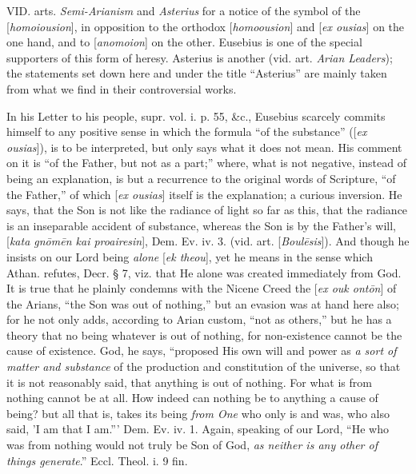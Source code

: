 
VID.
arts. \emph{Semi-Arianism} and
\emph{Asterius} for a
notice of the symbol of the [\emph{homoiousion}], in opposition to the
orthodox [\emph{homoousion}] and [\emph{ex ousias}] on the one hand,
and to [\emph{anomoion}] on the other. Eusebius is one of the special
supporters of this form of heresy. Asterius is another (vid. art. \emph{Arian
Leaders}); the statements set down here and under the title ``Asterius''
are mainly taken from what we find in their controversial works.

In his Letter to his people, supr. vol. i. p. 55,
\&c., Eusebius scarcely commits himself to any positive sense in
which the formula ``of the substance'' ([\emph{ex ousias}]), is to be
interpreted, but only says what it does not mean. His comment on it is
``of the Father, but not as a part;'' where, what is not negative,
instead of being an explanation, is but a recurrence to the original
words of Scripture, ``of the Father,'' of which [\emph{ex ousias}]
itself is the explanation; a curious inversion. He says, that the Son
is not like the radiance of light so far as this, that the radiance is
an inseparable accident of substance, whereas the Son is by the Father's
will, [\emph{kata gn\={o}m\={e}n kai proairesin}], Dem. Ev. iv.
3. (vid. art. [\emph{Boul\={e}sis}]). And though he insists on our
Lord being \emph{alone} [\emph{ek theou}], yet he means in the sense which Athan.
refutes, Decr. § 7, viz. that He alone was created immediately from
God. It is true that he plainly condemns with the Nicene Creed the [\emph{ex
ouk ont\={o}n}] of the Arians, ``the Son was out of nothing,'' but
an evasion was at hand here also; for he not only adds, according to
Arian custom, ``not as others,'' but he has a theory that no being
whatever is out of nothing, for non-existence cannot be the cause of
existence. God, he says, ``proposed His own will and power as \emph{a sort
of matter and substance} of
the production and constitution of the universe, so that it is not
reasonably said, that anything is out of nothing. For what is from
nothing cannot be at all. How indeed can nothing be to anything a
cause of being? but all that is, takes its being \emph{from One}
who only is and was, who also said, 'I am that I am.''' Dem. Ev.
iv. 1. Again, speaking of our Lord, ``He who was from nothing would not
truly be Son of God, \emph{as neither is any other of things generate}.'' Eccl. Theol. i. 9 fin.

